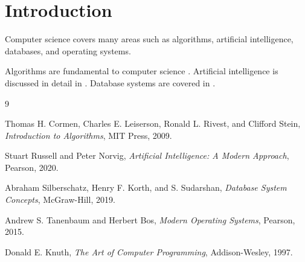 \documentclass{article}
\begin{document}
\section{Introduction}

Computer science covers many areas such as algorithms, artificial
intelligence, databases, and operating systems.

Algorithms are fundamental to computer science \cite{cormen}.
Artificial intelligence is discussed in detail in \cite{russell}.
Database systems are covered in \cite{silberschatz}.

\begin{thebibliography}{9}

Thomas H. Cormen, Charles E. Leiserson, Ronald L. Rivest,
and Clifford Stein,
\textit{Introduction to Algorithms},
MIT Press, 2009.

Stuart Russell and Peter Norvig,
\textit{Artificial Intelligence: A Modern Approach},
Pearson, 2020.

Abraham Silberschatz, Henry F. Korth, and S. Sudarshan,
\textit{Database System Concepts},
McGraw-Hill, 2019.

Andrew S. Tanenbaum and Herbert Bos,
\textit{Modern Operating Systems},
Pearson, 2015.

Donald E. Knuth,
\textit{The Art of Computer Programming},
Addison-Wesley, 1997.

\end{thebibliography}
\end{document}
